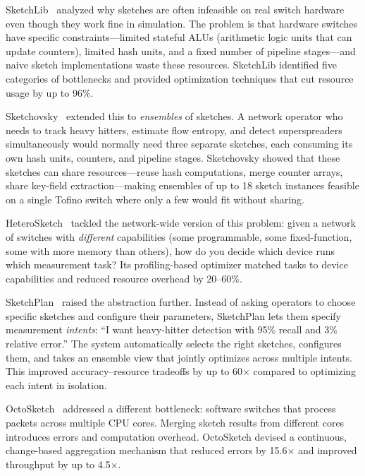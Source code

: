 \documentclass[letterpaper,twocolumn,10pt]{article}
\begin{document}
SketchLib~\cite{namkung2022sketchlib} analyzed why sketches are
often infeasible on real switch hardware even though they work
fine in simulation. The problem is that hardware switches have
specific constraints---limited stateful ALUs (arithmetic logic
units that can update counters), limited hash units, and a fixed
number of pipeline stages---and naive sketch implementations
waste these resources. SketchLib identified five categories of
bottlenecks and provided optimization techniques that cut
resource usage by up to 96\%.

Sketchovsky~\cite{namkung2023sketchovsky} extended this to
\emph{ensembles} of sketches. A network operator who needs to
track heavy hitters, estimate flow entropy, and detect
superspreaders simultaneously would normally need three separate
sketches, each consuming its own hash units, counters, and
pipeline stages. Sketchovsky showed that these sketches can share
resources---reuse hash computations, merge counter arrays, share
key-field extraction---making ensembles of up to 18 sketch
instances feasible on a single Tofino switch where only a few
would fit without sharing.

HeteroSketch~\cite{agarwal2022heterosketch} tackled the
network-wide version of this problem: given a network of switches
with \emph{different} capabilities (some programmable, some
fixed-function, some with more memory than others), how do you
decide which device runs which measurement task? Its
profiling-based optimizer matched tasks to device capabilities and
reduced resource overhead by 20--60\%.

SketchPlan~\cite{srivastava2024sketchplan} raised the
abstraction further. Instead of asking operators to choose
specific sketches and configure their parameters, SketchPlan lets
them specify measurement \emph{intents}: ``I want heavy-hitter
detection with 95\% recall and 3\% relative error.'' The system
automatically selects the right sketches, configures them, and
takes an ensemble view that jointly optimizes across multiple
intents. This improved accuracy--resource tradeoffs by up to
60$\times$ compared to optimizing each intent in isolation.

OctoSketch~\cite{zhang2024octosketch} addressed a different
bottleneck: software switches that process packets across
multiple CPU cores. Merging sketch results from different cores
introduces errors and computation overhead. OctoSketch devised a
continuous, change-based aggregation mechanism that reduced errors
by 15.6$\times$ and improved throughput by up to 4.5$\times$.
\end{document}
